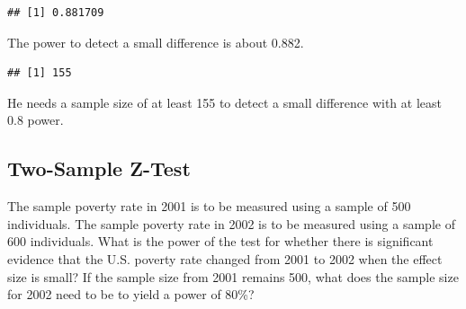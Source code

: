 \documentclass[
]{book}
\newenvironment{Shaded}{\begin{snugshade}}{\end{snugshade}}
\newcommand{\AttributeTok}[1]{\textcolor[rgb]{0.13,0.29,0.53}{#1}}
\newcommand{\DecValTok}[1]{\textcolor[rgb]{0.00,0.00,0.81}{#1}}
\newcommand{\DocumentationTok}[1]{\textcolor[rgb]{0.56,0.35,0.01}{\textbf{\textit{#1}}}}
\newcommand{\FloatTok}[1]{\textcolor[rgb]{0.00,0.00,0.81}{#1}}
\newcommand{\FunctionTok}[1]{\textcolor[rgb]{0.13,0.29,0.53}{\textbf{#1}}}
\newcommand{\NormalTok}[1]{#1}
\newcommand{\SpecialCharTok}[1]{\textcolor[rgb]{0.81,0.36,0.00}{\textbf{#1}}}
\newcommand{\StringTok}[1]{\textcolor[rgb]{0.31,0.60,0.02}{#1}}
\theoremstyle{definition}
\theoremstyle{definition}
\theoremstyle{definition}
\theoremstyle{definition}
\theoremstyle{remark}
\begin{document}
\begin{verbatim}
## [1] 0.881709
\end{verbatim}

The power to detect a small difference is about 0.882.

\begin{Shaded}
\end{Shaded}

\begin{verbatim}
## [1] 155
\end{verbatim}

He needs a sample size of at least 155 to detect a small difference with at least 0.8 power.

\hypertarget{two-sample-z-test}{%
\subsection{Two-Sample Z-Test}\label{two-sample-z-test}}

The sample poverty rate in 2001 is to be measured using a sample of 500 individuals. The sample poverty rate in 2002 is to be measured using a sample of 600 individuals. What is the power of the test for whether there is significant evidence that the U.S. poverty rate changed from 2001 to 2002 when the effect size is small? If the sample size from 2001 remains 500, what does the sample size for 2002 need to be to yield a power of 80\%?

\begin{Shaded}
\end{Shaded}
\end{document}
